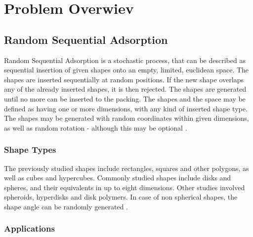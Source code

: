 \documentclass[12pt, oneside]{report}
\begin{document}

\tableofcontents
\newpage


\chapter{Problem Overwiev}
\section {Random Sequential Adsorption}

Random Sequential Adsorption is a stochastic process, that can be described as sequential insertion of given shapes onto an empty, limited, euclidean space. The shapes are inserted sequentially at random positions. If the new shape overlaps any of the already inserted shapes, it is then rejected. The shapes are generated until no more can be inserted to the packing. \newline
The shapes and the space may be defined as having one or more dimensions, with any kind of inserted shape type. The shapes may be generated with random coordinates within given dimensions, as well as random rotation - although this may be optional \cite{zhang,feder}.

\subsection {Shape Types}

The previously studied shapes include rectangles, squares and other polygons, as well as cubes and hypercubes. Commonly studied shapes include disks and spheres, and their equivalents in up to eight dimensions. Other studies involved spheroids, hyperdisks and disk polymers. In case of non spherical shapes, the shape angle can be randomly generated \cite{zhang}.

\subsection {Applications}
\end{document}
